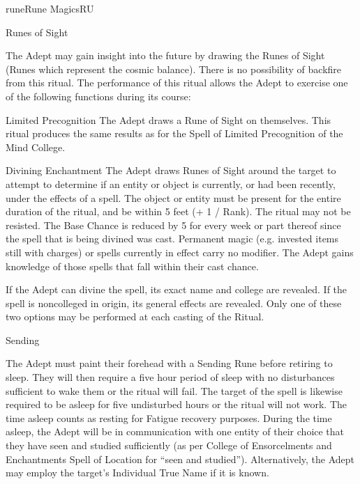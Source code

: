 \begin{College}[2.2]{rune}{Rune Magics}{RU}
\begin{ritual}[Q-2]{Runes of Sight}

\begin{effects}
The Adept may gain insight into the future by drawing the Runes of
Sight (Runes which represent the cosmic balance). There is no
possibility of backfire from this ritual.  The performance of this
ritual allows the Adept to exercise one of the following functions
during its course:
\begin{Description}
\item[Limited Precognition] The Adept draws a Rune of Sight on
  themselves. This ritual produces the same results as for the Spell
  of Limited Precognition of the Mind College.

\item[Divining Enchantment] The Adept draws Runes of Sight around the
  target to attempt to determine if an entity or object is currently,
  or had been recently, under the effects of a spell.  The object or
  entity must be present for the entire duration of the ritual, and be
  within 5 feet (+ 1 / Rank). The ritual may not be resisted.  The
  Base Chance is reduced by 5 for every week or part thereof since the
  spell that is being divined was cast.  Permanent magic (e.g.
  invested items still with charges) or spells currently in effect
  carry no modifier.  The Adept gains knowledge of those spells that
  fall within their cast chance.

  If the Adept can divine the spell, its exact name and college are
  revealed.  If the spell is noncolleged in origin, its general
  effects are revealed.  Only one of these two options may be
  performed at each casting of the Ritual.
\end{Description}
\end{effects}
\end{ritual}

\begin{ritual}[Q-3]{Sending}

\begin{effects}
The Adept must paint their forehead with a Sending Rune before
retiring to sleep.  They will then require a five hour period of sleep
with no disturbances sufficient to wake them or the ritual will
fail. The target of the spell is likewise required to be asleep for
five undisturbed hours or the ritual will not work. The time asleep
counts as resting for Fatigue recovery purposes. During the time
asleep, the Adept will be in communication with one entity of their
choice that they have seen and studied sufficiently (as per College of
Ensorcelments and Enchantments Spell of Location for “seen and
studied”). Alternatively, the Adept may employ the target’s Individual
True Name if it is known.


\end{effects}
\end{ritual}
\end{College}
